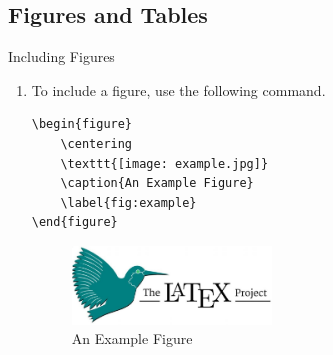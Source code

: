 \documentclass[8pt]{beamer}
\begin{document}
\subsection{Figures and Tables}

\begin{frame}[fragile]{\insertsection}{\insertsubsection}

    \begin{block}{Including Figures}
        \begin{enumerate}
            \item To include a figure, use the following command.
            \begin{lstlisting}[style=latex]
\begin{figure}
    \centering
    \texttt{[image: example.jpg]}
    \caption{An Example Figure}
    \label{fig:example}
\end{figure}
            \end{lstlisting}
            \begin{figure}
                \centering
                \includegraphics[width=0.5\textwidth]{figs/example.jpg}
                \caption{An Example Figure}
                \label{fig:example}
            \end{figure}
        \end{enumerate}
    \end{block}

\end{frame}
\end{document}
